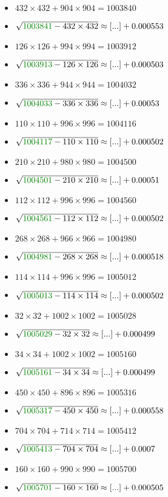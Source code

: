 \documentclass[12pt]{article}
\begin{document}
\begin{multicols}{2}
\begin{itemize}
\item $432×432 + 904×904 = 1003840$
\item $\sqrt{ {\color{green!50!black}{1003841}} - 432\times 432 } \approx [...] + 0.000553$
\item $126×126 + 994×994 = 1003912$
\item $\sqrt{ {\color{green!50!black}{1003913}} - 126\times 126 } \approx [...] + 0.000503$
\item $336×336 + 944×944 = 1004032$
\item $\sqrt{ {\color{green!50!black}{1004033}} - 336\times 336 } \approx [...] + 0.00053$
\item $110×110 + 996×996 = 1004116$
\item $\sqrt{ {\color{green!50!black}{1004117}} - 110\times 110 } \approx [...] + 0.000502$
\item $210×210 + 980×980 = 1004500$
\item $\sqrt{ {\color{green!50!black}{1004501}} - 210\times 210 } \approx [...] + 0.00051$
\item $112×112 + 996×996 = 1004560$
\item $\sqrt{ {\color{green!50!black}{1004561}} - 112\times 112 } \approx [...] + 0.000502$
\item $268×268 + 966×966 = 1004980$
\item $\sqrt{ {\color{green!50!black}{1004981}} - 268\times 268 } \approx [...] + 0.000518$
\item $114×114 + 996×996 = 1005012$
\item $\sqrt{ {\color{green!50!black}{1005013}} - 114\times 114 } \approx [...] + 0.000502$
\item $32×32 + 1002×1002 = 1005028$
\item $\sqrt{ {\color{green!50!black}{1005029}} - 32\times 32 } \approx [...] + 0.000499$
\item $34×34 + 1002×1002 = 1005160$
\item $\sqrt{ {\color{green!50!black}{1005161}} - 34\times 34 } \approx [...] + 0.000499$
\item $450×450 + 896×896 = 1005316$
\item $\sqrt{ {\color{green!50!black}{1005317}} - 450\times 450 } \approx [...] + 0.000558$
\item $704×704 + 714×714 = 1005412$
\item $\sqrt{ {\color{green!50!black}{1005413}} - 704\times 704 } \approx [...] + 0.0007$
\item $160×160 + 990×990 = 1005700$
\item $\sqrt{ {\color{green!50!black}{1005701}} - 160\times 160 } \approx [...] + 0.000505$

\end{itemize}
\end{multicols}
\end{document}
